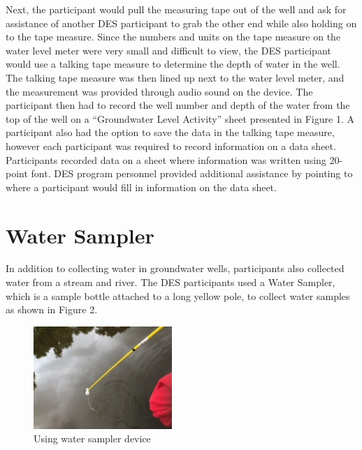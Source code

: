 \documentclass[11.5pt]{sig-alternate}
\begin{document}
\begin{large}
Next, the participant would pull the measuring tape out of the well and ask for assistance of another DES participant to grab the other end while also holding on to the tape measure.  Since the numbers and units on the tape measure on the water level meter were very small and difficult to view, the DES participant would use a talking tape measure to determine the depth of water in the well. The talking tape measure was then lined up next to the water level meter, and the measurement was provided through audio sound on the device. The participant then had to record the well number and depth of the water from the top of the well on a “Groundwater Level Activity” sheet presented in Figure 1. A participant also had the option to save the data in the talking tape measure, however each participant was required to record information on a data sheet. Participants recorded data on a sheet where information was written using 20-point font. DES program personnel provided additional assistance by pointing to where a participant would fill in information on the data sheet.  
\newpage
\section*{Water Sampler}

In addition to collecting water in groundwater wells, participants also collected water from a stream and river. The DES participants used a Water Sampler, which is a sample bottle attached to a long yellow pole, to collect water samples as shown in Figure 2.
\\
\begin{figure}[h] 
    \centering
    \includegraphics[width=\columnwidth]{figure2.png}
    \caption{Using water sampler device }
    \label{hands-on Bohr model using Styrofoam}
\end{figure}


\end{large}
\end{document}
